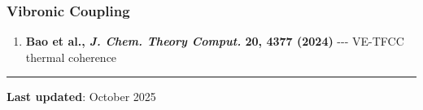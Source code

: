 \subsubsection{Vibronic Coupling}\label{vibronic-coupling}

\begin{enumerate}
\def\labelenumi{\arabic{enumi}.}
\setcounter{enumi}{6}
\tightlist
\item
  \textbf{Bao et al., \emph{J. Chem. Theory Comput.} 20, 4377 (2024)}
  -\/-\/- VE-TFCC thermal coherence
\end{enumerate}

\begin{center}\rule{0.5\linewidth}{0.5pt}\end{center}

\textbf{Last updated}: October 2025
